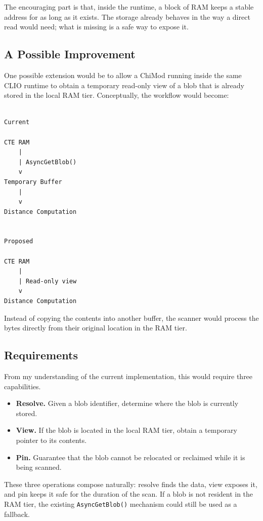 \documentclass[11pt]{article}
\begin{document}
The encouraging part is that, inside the runtime, a block of RAM keeps
a stable address for as long as it exists. The storage already behaves
in the way a direct read would need; what is missing is a safe way to
expose it.

\subsection{A Possible Improvement}

One possible extension would be to allow a ChiMod running inside the
same CLIO runtime to obtain a temporary read-only view of a blob that
is already stored in the local RAM tier. Conceptually, the workflow
would become:

\begin{verbatim}

Current

CTE RAM
    |
    | AsyncGetBlob()
    v
Temporary Buffer
    |
    v
Distance Computation


Proposed

CTE RAM
    |
    | Read-only view
    v
Distance Computation

\end{verbatim}

Instead of copying the contents into another buffer, the scanner would
process the bytes directly from their original location in the RAM
tier.

\subsection{Requirements}

From my understanding of the current implementation, this would
require three capabilities.

\begin{itemize}

\item \textbf{Resolve.} Given a blob identifier, determine where the
blob is currently stored.

\item \textbf{View.} If the blob is located in the local RAM tier,
obtain a temporary pointer to its contents.

\item \textbf{Pin.} Guarantee that the blob cannot be relocated or
reclaimed while it is being scanned.

\end{itemize}

These three operations compose naturally: resolve finds the data, view
exposes it, and pin keeps it safe for the duration of the scan. If a
blob is not resident in the RAM tier, the existing
\texttt{AsyncGetBlob()} mechanism could still be used as a fallback.
\end{document}
